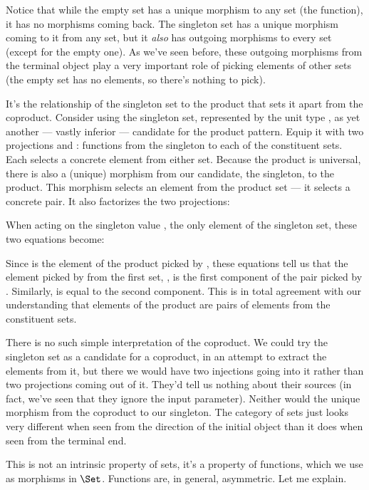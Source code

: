 Notice that while the empty set has a unique morphism to any set (the
 function), it has no morphisms coming back. The
singleton set has a unique morphism coming to it from any set, but it
\emph{also} has outgoing morphisms to every set (except for the empty
one). As we've seen before, these outgoing morphisms from the terminal
object play a very important role of picking elements of other sets (the
empty set has no elements, so there's nothing to pick).

It's the relationship of the singleton set to the product that sets it
apart from the coproduct. Consider using the singleton set, represented
by the unit type \code{()}, as yet another --- vastly inferior ---
candidate for the product pattern. Equip it with two projections
 and : functions from the singleton to each of the
constituent sets. Each selects a concrete element from either set.
Because the product is universal, there is also a (unique) morphism
 from our candidate, the singleton, to the product. This
morphism selects an element from the product set --- it selects a
concrete pair. It also factorizes the two projections:

When acting on the singleton value \code{()}, the only element of the
singleton set, these two equations become:

Since  is the element of the product picked by ,
these equations tell us that the element picked by  from the
first set, , is the first component of the pair picked by
. Similarly,  is equal to the second component.
This is in total agreement with our understanding that elements of the
product are pairs of elements from the constituent sets.

There is no such simple interpretation of the coproduct. We could try
the singleton set as a candidate for a coproduct, in an attempt to
extract the elements from it, but there we would have two injections
going into it rather than two projections coming out of it. They'd tell
us nothing about their sources (in fact, we've seen that they ignore the
input parameter). Neither would the unique morphism from the coproduct
to our singleton. The category of sets just looks very different when
seen from the direction of the initial object than it does when seen
from the terminal end.

This is not an intrinsic property of sets, it's a property of functions,
which we use as morphisms in $\Set$. Functions are, in general,
asymmetric. Let me explain.

